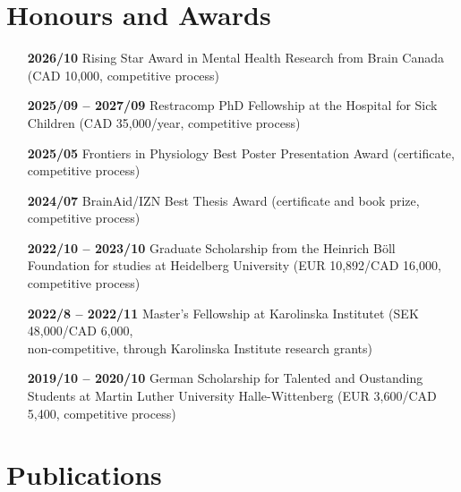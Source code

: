 \documentclass[12pt]{article}
\begin{document}
\section*{Honours and Awards}
\begin{itemize}
     \item[\textbf{2026/10}] Rising Star Award in Mental Health Research from Brain Canada (CAD 10,000, competitive process)
    \item[\textbf{2025/09 -- 2027/09}] Restracomp PhD Fellowship at the Hospital for Sick Children (CAD 35,000/year, competitive process)
    \item[\textbf{2025/05}] Frontiers in Physiology Best Poster Presentation Award (certificate, competitive process)
    \item[\textbf{2024/07}] BrainAid/IZN Best Thesis Award (certificate and book prize, competitive process)
    \item[\textbf{2022/10 -- 2023/10}] Graduate Scholarship from the Heinrich Böll Foundation for studies at Heidelberg University (EUR 10,892/CAD 16,000, competitive process)
    \item[\textbf{2022/8 -- 2022/11}] Master's Fellowship at Karolinska Institutet (SEK 48,000/CAD 6,000, \\ non-competitive, through Karolinska Institute research grants)
    \item[\textbf{2019/10 -- 2020/10}] German Scholarship for Talented and Oustanding Students at Martin Luther University Halle-Wittenberg (EUR 3,600/CAD 5,400, competitive process)
\end{itemize}

\section*{Publications}
\end{document}
